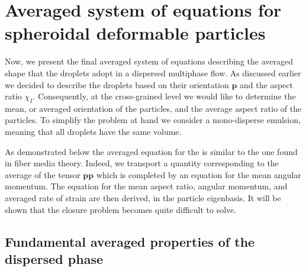 \section{Averaged system of equations for spheroidal deformable particles}
\label{sec:averaged_eq}


Now, we present the final averaged system of equations describing the averaged shape that the droplets adopt in a dispersed multiphase flow. 
As discussed earlier we decided to describe the droplets based on their orientation $\textbf{p}$ and the aspect ratio $\chi_I$.
Consequently, at the cross-grained level we would like to determine the mean, or averaged orientation of the particles, and the average aspect ratio of the particles.  
To simplify the problem at hand we consider a mono-disperse emulsion, meaning that all droplets have the same volume. 

As demonstrated below the averaged equation for the is similar to the one found in fiber media theory. 
Indeed, we transport a quantity corresponding to the average of the tensor $\textbf{pp}$ which is completed by an equation for the mean angular momentum. 
The equation for the mean aspect ratio, angular momentum, and averaged rate of strain are then derived, in the particle eigenbasis.
It will be shown that the closure problem becomes quite difficult to solve. 

\subsection{Fundamental averaged properties of the dispersed phase} 

